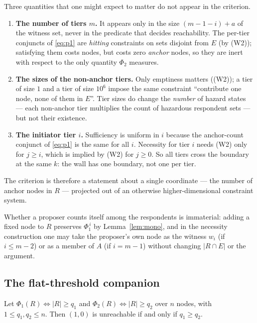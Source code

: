 \begin{remark}
\label{rem:independence}
Three quantities that one might expect to matter do not appear in the
criterion.
\begin{enumerate}
\item \textbf{The number of tiers $m$.}  It appears only in the size
  $(m-1-i)+a$ of the witness set, never in the predicate that decides
  reachability.  The per-tier conjuncts of \eqref{eq:p1} are
  \emph{hitting} constraints on sets disjoint from $E$ (by (W2)); satisfying
  them costs nodes, but costs zero \emph{anchor} nodes, so they are inert with
  respect to the only quantity $\Phi_2$ measures.
\item \textbf{The sizes of the non-anchor tiers.}  Only emptiness matters
  ((W2)); a tier of size $1$ and a tier of size $10^6$ impose the same
  constraint ``contribute one node, none of them in $E$''.  Tier sizes do
  change the \emph{number} of hazard states --- each non-anchor tier
  multiplies the count of hazardous respondent sets --- but not their
  existence.
\item \textbf{The initiator tier $i$.}  Sufficiency is uniform in $i$ because
  the anchor-count conjunct of \eqref{eq:p1} is the same for all $i$.
  Necessity for tier $i$ needs (W2) only for $j\ge i$, which is implied by
  (W2) for $j\ge 0$.  So all tiers cross the boundary at the same $k$: the
  wall has one boundary, not one per tier.
\end{enumerate}
The criterion is therefore a statement about a single coordinate --- the
number of anchor nodes in $R$ --- projected out of an otherwise
higher-dimensional constraint system.
\end{remark}

\begin{remark}
Whether a proposer counts itself among the respondents is immaterial:
adding a fixed node to $R$ preserves $\Phi_1^{\,i}$ by
Lemma~\ref{lem:mono}, and in the necessity construction one may take the
proposer's own node as the witness $w_i$ (if $i\le m-2$) or as a member of
$A$ (if $i=m-1$) without changing $|R\cap E|$ or the argument.
\end{remark}

\subsection{The flat-threshold companion}

\begin{corollary}
\label{cor:flat}
Let $\Phi_1(R)\iff|R|\ge q_1$ and $\Phi_2(R)\iff|R|\ge q_2$ over $n$ nodes,
with $1\le q_1,q_2\le n$.  Then $(1,0)$ is unreachable if and only if
$q_1\ge q_2$.
\end{corollary}

